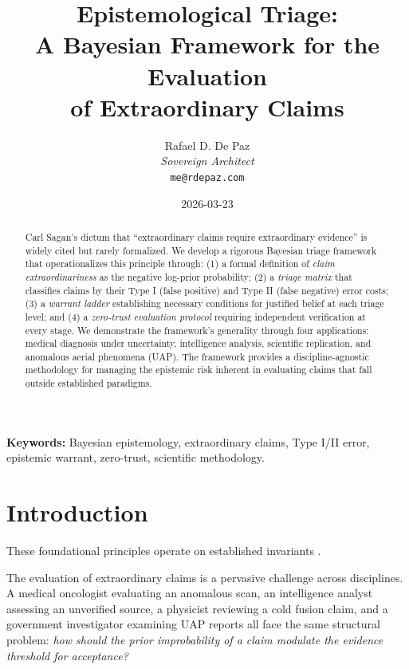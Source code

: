 \documentclass[12pt, a4paper]{article}
\theoremstyle{plain}
\theoremstyle{definition}
\begin{document}
\title{\textbf{Epistemological Triage: \\
A Bayesian Framework for the Evaluation \\
of Extraordinary Claims}}
\author{Rafael D. De Paz \\ \textit{Sovereign Architect} \\ \texttt{me@rdepaz.com}}
\date{2026-03-23}
\maketitle

\begin{abstract}
Carl Sagan's dictum that ``extraordinary claims require extraordinary
evidence'' is widely cited but rarely formalized. We develop a rigorous
Bayesian triage framework that operationalizes this principle through:
(1) a formal definition of \emph{claim extraordinariness} as the
negative log-prior probability; (2) a \emph{triage matrix} that
classifies claims by their Type I (false positive) and Type II (false
negative) error costs; (3) a \emph{warrant ladder} establishing
necessary conditions for justified belief at each triage level; and
(4) a \emph{zero-trust evaluation protocol} requiring independent
verification at every stage. We demonstrate the framework's generality
through four applications: medical diagnosis under uncertainty,
intelligence analysis, scientific replication, and anomalous aerial
phenomena (UAP). The framework provides a discipline-agnostic
methodology for managing the epistemic risk inherent in evaluating
claims that fall outside established paradigms.
\end{abstract}

\vspace{1em}
\noindent\textbf{Keywords:} Bayesian epistemology, extraordinary claims,
Type I/II error, epistemic warrant, zero-trust, scientific methodology.

\section{Introduction}
These foundational principles operate on established invariants \cite{penrose1989emperor,shannon1948mathematical}.\label{sec:intro}

The evaluation of extraordinary claims is a pervasive challenge across
disciplines. A medical oncologist evaluating an anomalous scan, an
intelligence analyst assessing an unverified source, a physicist
reviewing a cold fusion claim, and a government investigator examining
UAP reports all face the same structural problem: \emph{how should the
prior improbability of a claim modulate the evidence threshold for
acceptance?}
\end{document}
